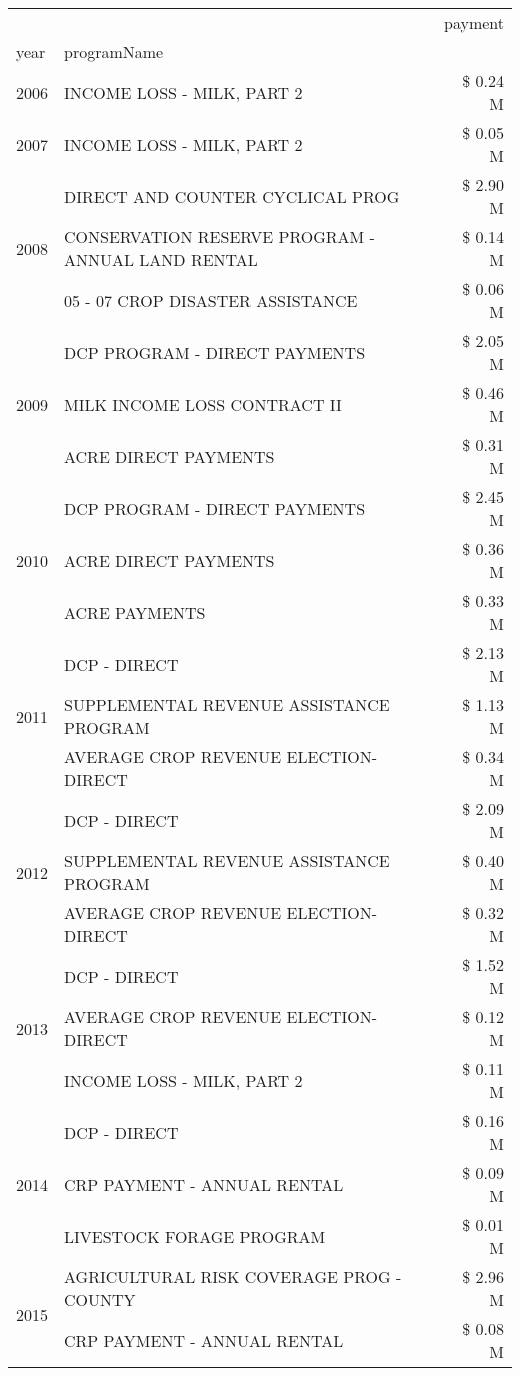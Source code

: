 \begin{tabular}{llr}
\toprule
 &  & payment \\
year & programName &  \\
\midrule
2006 & INCOME LOSS - MILK, PART 2 & \$ 0.24 M \\
\cline{1-3}
2007 & INCOME LOSS - MILK, PART 2 & \$ 0.05 M \\
\cline{1-3}
\multirow[t]{3}{*}{2008} & DIRECT AND COUNTER CYCLICAL PROG & \$ 2.90 M \\
 & CONSERVATION RESERVE PROGRAM - ANNUAL LAND RENTAL & \$ 0.14 M \\
 & 05 - 07 CROP DISASTER ASSISTANCE & \$ 0.06 M \\
\cline{1-3}
\multirow[t]{3}{*}{2009} & DCP PROGRAM - DIRECT PAYMENTS & \$ 2.05 M \\
 & MILK INCOME LOSS CONTRACT II & \$ 0.46 M \\
 & ACRE DIRECT PAYMENTS & \$ 0.31 M \\
\cline{1-3}
\multirow[t]{3}{*}{2010} & DCP PROGRAM - DIRECT PAYMENTS & \$ 2.45 M \\
 & ACRE DIRECT PAYMENTS & \$ 0.36 M \\
 & ACRE PAYMENTS & \$ 0.33 M \\
\cline{1-3}
\multirow[t]{3}{*}{2011} & DCP - DIRECT & \$ 2.13 M \\
 & SUPPLEMENTAL REVENUE ASSISTANCE PROGRAM & \$ 1.13 M \\
 & AVERAGE CROP REVENUE ELECTION-DIRECT & \$ 0.34 M \\
\cline{1-3}
\multirow[t]{3}{*}{2012} & DCP - DIRECT & \$ 2.09 M \\
 & SUPPLEMENTAL REVENUE ASSISTANCE PROGRAM & \$ 0.40 M \\
 & AVERAGE CROP REVENUE ELECTION-DIRECT & \$ 0.32 M \\
\cline{1-3}
\multirow[t]{3}{*}{2013} & DCP - DIRECT & \$ 1.52 M \\
 & AVERAGE CROP REVENUE ELECTION-DIRECT & \$ 0.12 M \\
 & INCOME LOSS - MILK, PART 2 & \$ 0.11 M \\
\cline{1-3}
\multirow[t]{3}{*}{2014} & DCP - DIRECT & \$ 0.16 M \\
 & CRP PAYMENT - ANNUAL RENTAL & \$ 0.09 M \\
 & LIVESTOCK FORAGE PROGRAM & \$ 0.01 M \\
\cline{1-3}
\multirow[t]{3}{*}{2015} & AGRICULTURAL RISK COVERAGE PROG - COUNTY & \$ 2.96 M \\
 & CRP PAYMENT - ANNUAL RENTAL & \$ 0.08 M \\

\end{tabular}
